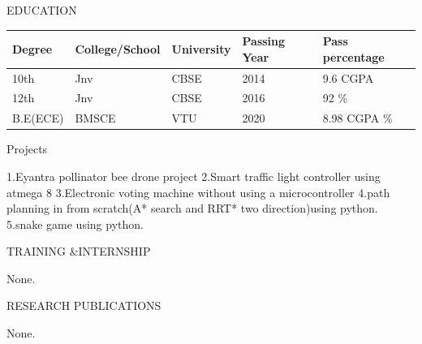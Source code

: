 \documentclass[10pt]{article}
\begin{document}
	\begin{minipage}[t][2cm][t]{0.2\textwidth}
	EDUCATION
		
	\end{minipage}
	\begin{minipage}[t][2cm][t]{0.8\textwidth}
		
	\begin{tabular}{ | l |  l |  l |  l |  l |} 
	\hline
	Degree & College/School & University & Passing Year & Pass percentage \\ 
	\hline
	\hline
	10th & Jnv & CBSE & 2014 & 9.6 CGPA  \\ 
\hline
12th & Jnv & CBSE & 2016 & 92 \%  \\ 
\hline
B.E(ECE) & BMSCE & VTU & 2020 & 8.98 CGPA \%  \\ 
\hline
	
	\end{tabular}
	\end{minipage}




	

	
	\begin{minipage}[t][3cm][t]{0.2\textwidth}
		Projects
		
	\end{minipage}
	\begin{minipage}[t][3cm][t]{0.8\textwidth}
		1.Eyantra pollinator bee drone project
		\newline 2.Smart traffic light controller using atmega 8
		\newline 3.Electronic voting machine without using a microcontroller
		\newline 4.path planning in from scratch(A* search and RRT* two direction)using python.
		\newline 5.snake game using python.
		
	\end{minipage}



	

	
	\begin{minipage}[t][2cm][t]{0.2\textwidth}
		TRAINING \&INTERNSHIP
		
	\end{minipage}
	\begin{minipage}[t][2cm][t]{0.8\textwidth}
		None.

	\end{minipage}
	
		

		
	\begin{minipage}[t][2cm][t]{0.2\textwidth}
		RESEARCH PUBLICATIONS
		
	\end{minipage}
	\begin{minipage}[t][2cm][t]{0.8\textwidth}
		None.
		
	\end{minipage}
\end{document}
